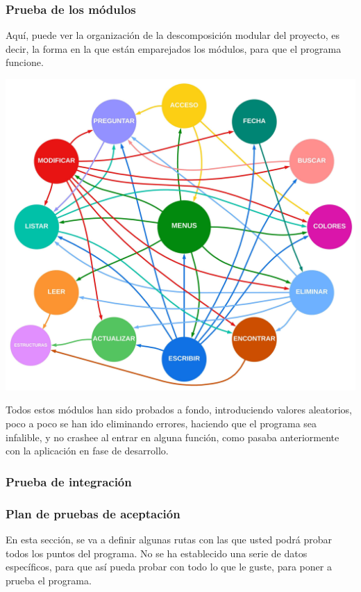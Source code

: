 \subsubsection{Prueba de los módulos}

Aquí, puede ver la organización de la descomposición modular del proyecto, es decir, la forma en la que están emparejados los módulos, para que el programa funcione.\\
\begin{center}
  \includegraphics[width=1.1\textwidth]{FOTOS/descomposicion_modular}
\end{center}
\label{fig:DescomposicionModular}

Todos estos módulos han sido probados a fondo, introduciendo valores aleatorios, poco a poco se han ido eliminando errores, haciendo que el programa sea infalible,
y no crashee al entrar en alguna función, como pasaba anteriormente con la aplicación en fase de desarrollo.

\subsubsection{Prueba de integración}

\subsubsection{Plan de pruebas de aceptación}

En esta sección, se va a definir algunas rutas con las que usted podrá probar todos los puntos del programa. No se ha establecido una serie de datos específicos, para que así pueda probar con
todo lo que le guste, para poner a prueba el programa.

